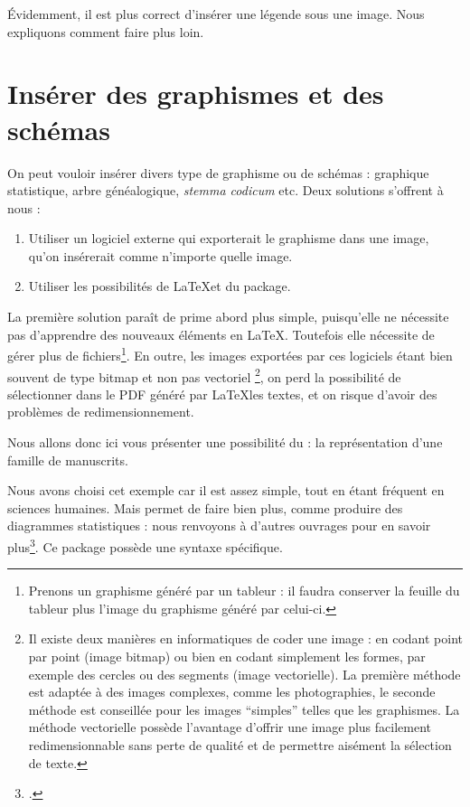 \begin{attention}
    Évidemment, il est plus correct d'insérer une légende sous une image. Nous expliquons comment faire plus loin.
\end{attention}

\section{Insérer des graphismes et des schémas}

On peut vouloir insérer divers type de graphisme ou de schémas : graphique statistique, arbre généalogique, \emph{stemma codicum} etc.
Deux solutions s'offrent à nous :
\begin{enumerate}
\item Utiliser un logiciel externe qui exporterait le graphisme dans une image, qu'on insérerait comme n'importe quelle image.
\item Utiliser les possibilités de \LaTeX et du package.\label{TikZ}
\end{enumerate}

La première solution paraît de prime abord plus simple, puisqu'elle ne nécessite pas d'apprendre des nouveaux éléments en \LaTeX. Toutefois elle nécessite de gérer plus de fichiers\footnote{Prenons un graphisme généré par un tableur : il faudra conserver la feuille du tableur plus l'image du graphisme généré par celui-ci.}. En outre, les images exportées par ces logiciels étant bien souvent de type bitmap et non pas vectoriel%
\footnote{Il existe deux manières en informatiques de coder une image : en codant point par point (image bitmap) ou bien en codant simplement les formes, par exemple des cercles ou des segments (image vectorielle). La première méthode est adaptée à des images complexes, comme les photographies,  le seconde méthode est conseillée pour les images \enquote{simples} telles que les graphismes. La méthode vectorielle possède l'avantage d'offrir une image plus facilement redimensionnable  sans perte de qualité et de permettre aisément la sélection de texte.},
on perd la possibilité de sélectionner dans le PDF généré par \LaTeX les textes, et on risque d'avoir des problèmes de redimensionnement.

Nous allons donc ici vous présenter une possibilité du  : la représentation d'une famille de manuscrits. 

Nous avons choisi cet exemple car il est assez simple, tout en étant fréquent en sciences humaines. Mais  permet de faire bien plus, comme produire des diagrammes statistiques : nous renvoyons à d'autres ouvrages pour en savoir plus\footcites[Outre le manuel][]{tikz}[on pourra lire][]{tikzimpatient}[on pourra également consulter le site ][]{tikzexample}.
Ce package possède une syntaxe spécifique. 

